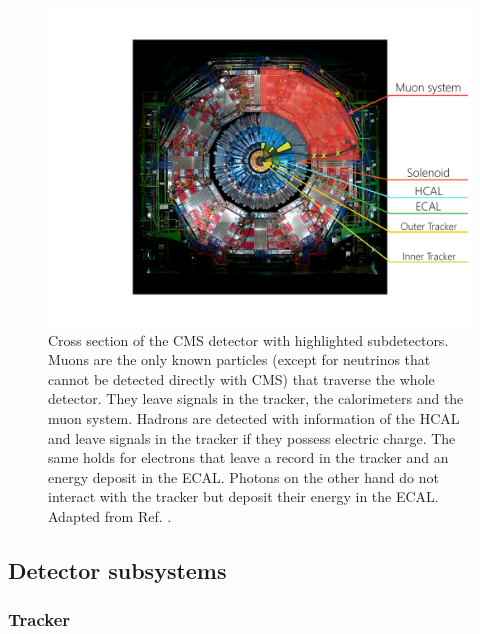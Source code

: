 \begin{figure}[h]
    \centering
    \includegraphics[width=\textwidth]{Figures/setup/CMS_front_view_modified}
    \caption[CMS Detector front view.]{Cross section of the CMS detector with highlighted subdetectors. Muons are the only known particles (except for neutrinos that cannot be detected directly with CMS) that traverse the whole detector. They leave signals in the tracker, the calorimeters and the muon system. Hadrons are detected with information 
    of the HCAL and leave signals in the tracker if they possess electric charge. The same holds for electrons that leave a record in the tracker and an energy deposit in the ECAL. Photons on the other hand 
    do not interact with the tracker but deposit their energy in the ECAL. Adapted from Ref. \cite{cds_openphoto_cms_frontview}.}\label{CMS:Front_view}
\end{figure}

\subsection{Detector subsystems}

\subsubsection{Tracker}

